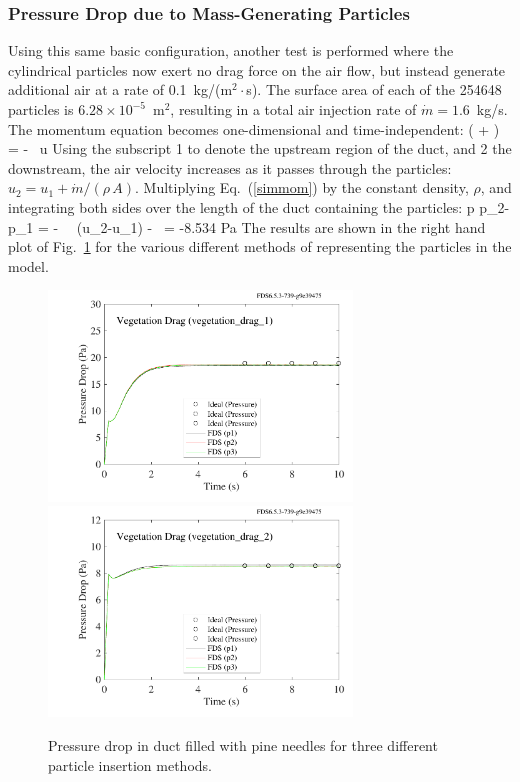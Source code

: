 \documentclass[11pt]{book}
\begin{document}
\subsubsection{Pressure Drop due to Mass-Generating Particles}

Using this same basic configuration, another test is performed where the cylindrical particles now exert no drag force on the air flow, but instead generate additional air at a rate of 0.1~kg/(m$^2 \cdot$s). The surface area of each of the 254648 particles is $6.28 \times 10^{-5}$~m$^2$, resulting in a total air injection rate of $\dot{m}=1.6$~kg/s. The momentum equation becomes one-dimensional and time-independent:
\be
    \left(  +  \right) = -   \, u  \label{simmom}
\ee
Using the subscript 1 to denote the upstream region of the duct, and 2 the downstream, the air velocity increases as it passes through the particles: $u_2=u_1+\dot{m}/(\rho \, A)$. Multiplying Eq.~(\ref{simmom}) by the constant density, $\rho$, and integrating both sides over the length of the duct containing the particles:
\be
   \Delta p \equiv p_2-p_1 =  - \rho \,  \, (u_2-u_1) -  \,  = -8.534  \; {\rm Pa}
\ee
The results are shown in the right hand plot of Fig.~\ref{vegetation_drag_fig} for the various different methods of representing the particles in the model.

\begin{figure}[ht]
\includegraphics[height=2.2in]{SCRIPT_FIGURES/vegetation_drag_1}
\includegraphics[height=2.2in]{SCRIPT_FIGURES/vegetation_drag_2}
\caption[The {\ct vegetation\_drag} test cases]{Pressure drop in duct filled with pine needles for three different particle insertion methods.}
\label{vegetation_drag_fig}
\end{figure}
\end{document}
